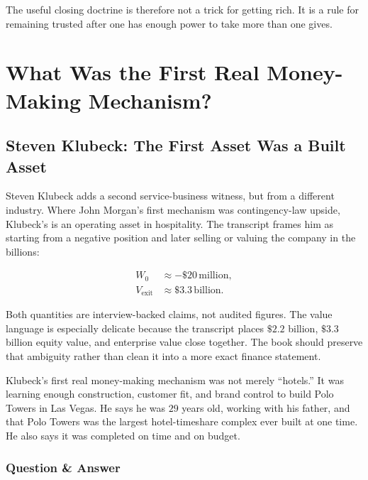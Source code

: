 \documentclass[11pt,oneside]{book}
\begin{document}
The useful closing doctrine is therefore not a trick for getting rich. It is a rule for remaining trusted after one has enough power to take more than one gives.


\chapter{What Was the First Real Money-Making Mechanism?}

\section{Steven Klubeck: The First Asset Was a Built Asset}

Steven Klubeck adds a second service-business witness, but from a different industry. Where John Morgan's first mechanism was contingency-law upside, Klubeck's is an operating asset in hospitality. The transcript frames him as starting from a negative position and later selling or valuing the company in the billions:

\begin{align}
W_0 &\approx -\$20\,\mathrm{million},\\
V_{\mathrm{exit}} &\approx \$3.3\,\mathrm{billion}.
\end{align}

Both quantities are interview-backed claims, not audited figures. The value language is especially delicate because the transcript places \(\$2.2\) billion, \(\$3.3\) billion equity value, and enterprise value close together. The book should preserve that ambiguity rather than clean it into a more exact finance statement.

Klubeck's first real money-making mechanism was not merely ``hotels.'' It was learning enough construction, customer fit, and brand control to build Polo Towers in Las Vegas. He says he was \(29\) years old, working with his father, and that Polo Towers was the largest hotel-timeshare complex ever built at one time. He also says it was completed on time and on budget.

\subsection{Question \& Answer}
\end{document}

